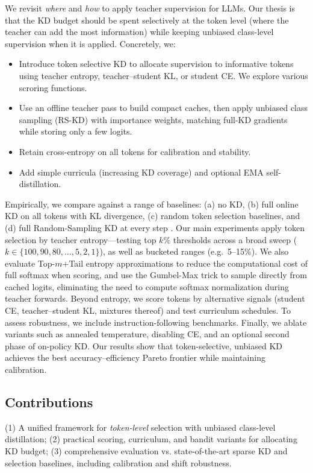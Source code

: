 \documentclass[11pt]{article}
\begin{document}
We revisit \emph{where} and \emph{how} to apply teacher supervision for LLMs.
Our thesis is that the KD budget should be spent selectively at the token level (where the teacher can add the most information) while keeping unbiased class-level supervision when it is applied.
Concretely, we:

\begin{itemize}
	\item Introduce token selective KD to allocate supervision to informative tokens using teacher entropy, teacher--student KL, or student CE. We explore various scroring functions.
	\item Use an offline teacher pass to build compact caches, then apply unbiased class sampling (RS-KD) with importance weights, matching full-KD gradients while storing only a few logits.
	\item Retain cross-entropy on all tokens for calibration and stability.
	\item Add simple curricula (increasing KD coverage) and optional EMA self-distillation.
\end{itemize}

Empirically, we compare against a range of baselines: (a) no KD, (b) full online KD on all tokens with KL divergence, (c) random token selection baselines, and (d) full Random-Sampling KD at every step \citep{anshumann2025sparse}.
Our main experiments apply token selection by teacher entropy---testing top $k\%$ thresholds across a broad sweep ($k \in \{100,90,80,\dots,5,2,1\}$), as well as bucketed ranges (e.g.\ 5--15\%).
We also evaluate Top-$m$+Tail entropy approximations to reduce the computational cost of full softmax when scoring, and use the Gumbel-Max trick to sample directly from cached logits, eliminating the need to compute softmax normalization during teacher forwards.
Beyond entropy, we score tokens by alternative signals (student CE, teacher--student KL, mixtures thereof) and test curriculum schedules.
To assess robustness, we include instruction-following benchmarks.
Finally, we ablate variants such as annealed temperature, disabling CE, and an optional second phase of on-policy KD.
Our results show that token-selective, unbiased KD achieves the best accuracy--efficiency Pareto frontier while maintaining calibration.

\subsection{Contributions} (1) A unified framework for \emph{token-level} selection with unbiased class-level distillation; (2) practical scoring, curriculum, and bandit variants for allocating KD budget; (3) comprehensive evaluation vs. state-of-the-art sparse KD and selection baselines, including calibration and shift robustness.
\end{document}
